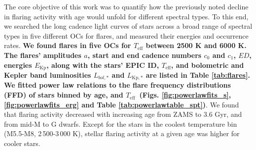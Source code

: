 \documentclass{aa}
\begin{document}
The core objective of this work was to quantify how the previously noted decline in flaring activity with age would unfold for different spectral types. To this end, we searched the long cadence light curves of stars across a broad range of spectral types in five different OCs for flares, and measured their energies and occurrence rates. \textbf{We found \unskip flares in five OCs for $T_\mathrm{eff}$ between 2500 K and 6000 K. The flares' amplitudes $a$, start and end cadence numbers $c_0$ and $c_1$, $ED$, energies $E_\mathrm{Kp}$, along with the stars' EPIC ID, $T_\mathrm{eff}$, and bolometric and Kepler band luminosities $L_{bol,*}$ and $L_\mathrm{Kp,*}$ are listed in Table \ref{tab:flares}. We fitted power law relations to the flare frequency distributions (FFD) of stars binned by age, and $T_\mathrm{eff}$~(Figs. \ref{fig:powerlawfits_s}, \ref{fig:powerlawfits_erg} and Table \ref{tab:powerlawtable_spt})}. We found that flaring activity decreased with increasing age from ZAMS to 3.6 Gyr, and from mid-M to G dwarfs. Except for the stars in the coolest temperature bin (M5.5-M8, 2\,500-3\,000 K), stellar flaring activity at a given age was higher for cooler stars.
\end{document}
